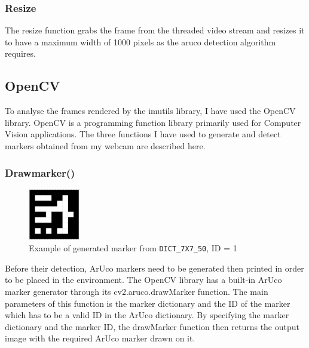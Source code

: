 \documentclass[oneside,%
                    author={Malak Hajji},
                    degree={BSc},
                    title={Designing An Accessible Computational Toolkit For Students},
                  subtitle={With Mixed Visual Abilities}]{dissertation}
\begin{document}
\subsubsection{Resize}
The resize function grabs the frame from the threaded video stream and resizes it to have a maximum width of 1000 pixels as the aruco detection algorithm requires.

\subsection{OpenCV}
To analyse the frames rendered by the imutils library, I have used the OpenCV library. OpenCV is a programming function library primarily used for Computer Vision applications. The three functions I have used to generate and detect markers obtained from my webcam are described here. 

\subsubsection{Drawmarker()}
\FloatBarrier
\begin{figure}[h]
    \centering
    \includegraphics[width=0.2\textwidth]{thesis/marker.eps}
    \caption{Example of generated marker from  \texttt{DICT\_7X7\_50}, ID = 1}
    \label{fig-marker}
\end{figure}
\FloatBarrier
Before their detection, ArUco markers need to be generated then printed in order to be placed in the environment. The OpenCV library has a built-in ArUco marker generator through its 
cv2.aruco.drawMarker function. The main parameters of this function is the marker dictionary and the ID of the marker which has to be a valid ID in the ArUco dictionary. By specifying the marker dictionary and the marker ID, the drawMarker function then returns the output image with the required ArUco marker drawn on it. 
\end{document}

